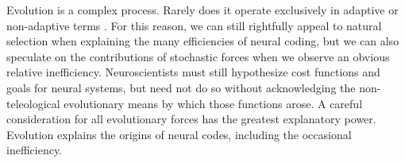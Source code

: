 \documentclass[twocolumn]{article}
\begin{document}
Evolution is a complex process. Rarely does it operate exclusively in adaptive or non-adaptive terms \cite{Gould_Lewontin_1979}. For this reason, we can still rightfully appeal to natural selection when explaining the many efficiencies of neural coding, but we can also speculate on the contributions of stochastic forces when we observe an obvious relative inefficiency. Neuroscientists must still hypothesize cost functions and goals for neural systems, but need not do so without acknowledging the non-teleological evolutionary means by which those functions arose. A careful consideration for all evolutionary forces has the greatest explanatory power. Evolution explains the origins of neural codes, including the occasional inefficiency. 

\newpage
 

\end{document}
